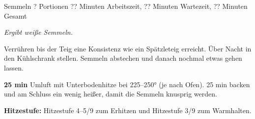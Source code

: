 \begin{recipe}{Semmeln} {? Portionen} {?? Minuten Arbeitszeit, ?? Minuten Wartezeit, ?? Minuten Gesamt}

  \freeform{}\textit{Ergibt weiße Semmeln.}


  Verrühren bis der Teig eine Konsistenz wie ein Spätzleteig erreicht.
  Über Nacht in den Kühlschrank stellen.
  Semmeln abstechen und danach nochmal etwas gehen lassen.

  \newstep{}\textbf{25 min}
  Umluft mit Unterbodenhitze bei 225--250° (je nach Ofen).
  25 min backen und am Schluss ein wenig heißer, damit die Semmeln knusprig werden.

  \freeform{}\hrulefill{}

  \freeform{}\textbf{Hitzestufe:}
  Hitzestufe 4–5/9 zum Erhitzen und Hitzestufe 3/9 zum Warmhalten.

\end{recipe}
